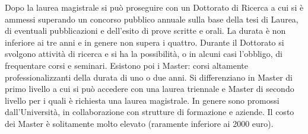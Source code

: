 Dopo la laurea magistrale si può proseguire con un Dottorato di Ricerca a cui si è ammessi superando un concorso pubblico annuale sulla base della tesi di Laurea, di eventuali pubblicazioni  e dell’esito di prove scritte e orali. La durata è non inferiore ai tre anni e in genere non supera i quattro. Durante il Dottorato si svolgono attività di ricerca e si ha la possibilità, o in alcuni casi l’obbligo, di frequentare corsi e seminari.
Esistono poi i Master: corsi altamente professionalizzanti della durata di uno o due anni. Si differenziano in Master di primo livello a cui si può accedere con una laurea triennale e Master di secondo livello per i quali è richiesta una laurea magistrale. In genere sono promossi dall'Università, in collaborazione con strutture di formazione e aziende. Il costo dei Master è solitamente molto elevato (raramente inferiore ai 2000 euro).

